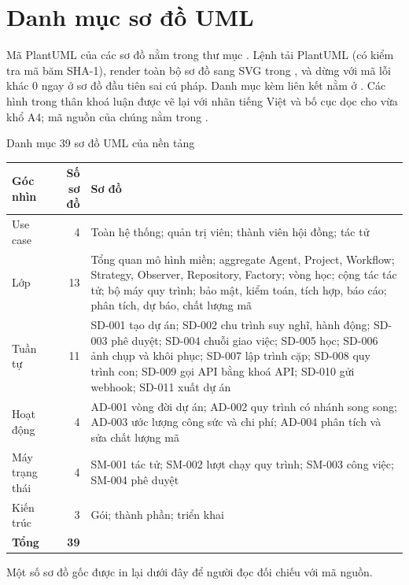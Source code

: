 \chapter{Danh mục sơ đồ UML}
\label{app:uml}

Mã PlantUML của các sơ đồ nằm trong thư mục . Lệnh  tải PlantUML (có kiểm tra mã băm SHA-1), render toàn bộ sơ đồ sang SVG trong , và dừng với mã lỗi khác 0 ngay ở sơ đồ đầu tiên sai cú pháp. Danh mục kèm liên kết nằm ở . Các hình trong thân khoá luận được vẽ lại với nhãn tiếng Việt và bố cục dọc cho vừa khổ A4; mã nguồn của chúng nằm trong .

\begin{table}{Danh mục 39 sơ đồ UML của nền tảng}
\label{tab:ds-uml}
\small
\begin{tabularx}{\textwidth}{|P{2.6cm}|r|L|}
\hline
\textbf{Góc nhìn} & \textbf{Số sơ đồ} & \textbf{Sơ đồ} \\ \hline
Use case & 4 & Toàn hệ thống; quản trị viên; thành viên hội đồng; tác tử \\ \hline
Lớp & 13 & Tổng quan mô hình miền; aggregate Agent, Project, Workflow; Strategy, Observer, Repository, Factory; vòng học; cộng tác tác tử; bộ máy quy trình; bảo mật, kiểm toán, tích hợp, báo cáo; phân tích, dự báo, chất lượng mã \\ \hline
Tuần tự & 11 & SD-001 tạo dự án; SD-002 chu trình suy nghĩ, hành động; SD-003 phê duyệt; SD-004 chuỗi giao việc; SD-005 học; SD-006 ảnh chụp và khôi phục; SD-007 lập trình cặp; SD-008 quy trình con; SD-009 gọi API bằng khoá API; SD-010 gửi webhook; SD-011 xuất dự án \\ \hline
Hoạt động & 4 & AD-001 vòng đời dự án; AD-002 quy trình có nhánh song song; AD-003 ước lượng công sức và chi phí; AD-004 phân tích và sửa chất lượng mã \\ \hline
Máy trạng thái & 4 & SM-001 tác tử; SM-002 lượt chạy quy trình; SM-003 công việc; SM-004 phê duyệt \\ \hline
Kiến trúc & 3 & Gói; thành phần; triển khai \\ \hline
\textbf{Tổng} & \textbf{39} & \\ \hline
\end{tabularx}
\end{table}

Một số sơ đồ gốc được in lại dưới đây để người đọc đối chiếu với mã nguồn.

